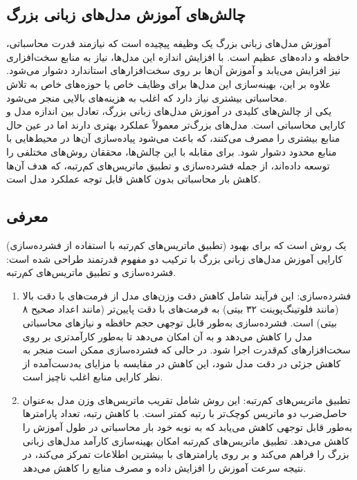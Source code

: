 \subsection{چالش‌های آموزش مدل‌های زبانی بزرگ}

آموزش مدل‌های زبانی بزرگ یک وظیفه پیچیده است که نیازمند قدرت محاسباتی، حافظه و داده‌های عظیم است. با افزایش اندازه این مدل‌ها، نیاز به منابع سخت‌افزاری نیز افزایش می‌یابد و آموزش آن‌ها بر روی سخت‌افزارهای استاندارد دشوار می‌شود. علاوه بر این، بهینه‌سازی این مدل‌ها برای وظایف خاص یا حوزه‌های خاص به تلاش محاسباتی بیشتری نیاز دارد که اغلب به هزینه‌های بالایی منجر می‌شود.
\\
یکی از چالش‌های کلیدی در آموزش مدل‌های زبانی بزرگ، تعادل بین اندازه مدل و کارایی محاسباتی است. مدل‌های بزرگ‌تر معمولاً عملکرد بهتری دارند اما در عین حال منابع بیشتری را مصرف می‌کنند، که باعث می‌شود پیاده‌سازی آن‌ها در محیط‌هایی با منابع محدود دشوار شود. برای مقابله با این چالش‌ها، محققان روش‌های مختلفی را توسعه داده‌اند، از جمله فشرده‌سازی و تطبیق ماتریس‌های کم‌رتبه، که هدف آن‌ها کاهش بار محاسباتی بدون کاهش قابل توجه عملکرد مدل است.

\subsection{معرفی }

 (تطبیق ماتریس‌های کم‌رتبه با استفاده از فشرده‌سازی) یک روش است که برای بهبود کارایی آموزش مدل‌های زبانی بزرگ با ترکیب دو مفهوم قدرتمند طراحی شده است: فشرده‌سازی و تطبیق ماتریس‌های کم‌رتبه.
\begin{enumerate}
	\item
	      فشرده‌سازی: این فرآیند شامل کاهش دقت وزن‌های مدل از فرمت‌های با دقت بالا (مانند فلوتینگ‌پوینت ۳۲ بیتی) به فرمت‌های با دقت پایین‌تر (مانند اعداد صحیح ۸ بیتی) است. فشرده‌سازی به‌طور قابل توجهی حجم حافظه و نیازهای محاسباتی مدل را کاهش می‌دهد و به آن امکان می‌دهد تا به‌طور کارآمدتری بر روی سخت‌افزارهای کم‌قدرت اجرا شود. در حالی که فشرده‌سازی ممکن است منجر به کاهش جزئی در دقت مدل شود، این کاهش در مقایسه با مزایای به‌دست‌آمده از نظر کارایی منابع اغلب ناچیز است.
	\item
	      تطبیق ماتریس‌های کم‌رتبه: این روش شامل تقریب ماتریس‌های وزن مدل به‌عنوان حاصل‌ضرب دو ماتریس کوچک‌تر با رتبه کمتر است. با کاهش رتبه، تعداد پارامترها به‌طور قابل توجهی کاهش می‌یابد که به نوبه خود بار محاسباتی در طول آموزش را کاهش می‌دهد. تطبیق ماتریس‌های کم‌رتبه امکان بهینه‌سازی کارآمد مدل‌های زبانی بزرگ را فراهم می‌کند و بر روی پارامترهای با بیشترین اطلاعات تمرکز می‌کند، در نتیجه سرعت آموزش را افزایش داده و مصرف منابع را کاهش می‌دهد.
\end{enumerate}

